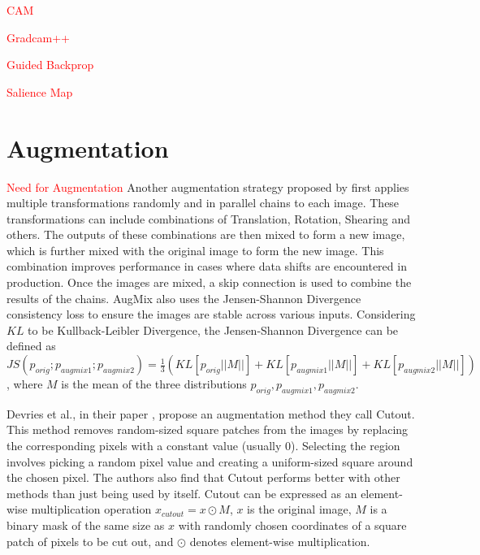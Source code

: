 \textcolor{red}{CAM}

\textcolor{red}{Gradcam++}

\textcolor{red}{Guided Backprop}

\textcolor{red}{Salience Map}

\section{Augmentation} \label{sec:augmentation}
\textcolor{red}{Need for Augmentation}
Another augmentation strategy proposed by \cite{hendrycksAugMixSimpleData2020} first applies multiple transformations randomly and in parallel chains to each image. These transformations can include combinations of Translation, Rotation, Shearing and others. The outputs of these combinations are then mixed to form a new image, which is further mixed with the original image to form the new image. This combination improves performance in cases where data shifts are encountered in production. Once the images are mixed, a skip connection is used to combine the results of the chains. AugMix also uses the Jensen-Shannon Divergence consistency loss \cite{linDivergenceMeasuresBased} to ensure the images are stable across various inputs. Considering $KL$ to be Kullback-Leibler Divergence, the Jensen-Shannon Divergence can be defined as $
    JS(p_{orig}; p_{augmix1};p_{augmix2}) = \frac{1}{3}(KL[p_{orig}||M||]+KL[p_{augmix1}||M||]+KL[p_{augmix2}||M||])
$, where $M$ is the mean of the three distributions $p_{orig}, p_{augmix1}, p_{augmix2}$.

Devries et al., in their paper \cite{devriesImprovedRegularizationConvolutional2017}, propose an augmentation method they call Cutout. This method removes random-sized square patches from the images by replacing the corresponding pixels with a constant value (usually 0). Selecting the region involves picking a random pixel value and creating a uniform-sized square around the chosen pixel. The authors also find that Cutout performs better with other methods than just being used by itself. Cutout can be expressed as an element-wise multiplication operation $x_{cutout} = x \odot M$,
$x$ is the original image, $M$ is a binary mask of the same size as $x$ with randomly chosen coordinates of a square patch of pixels to be cut out, and $\odot$ denotes element-wise multiplication.

